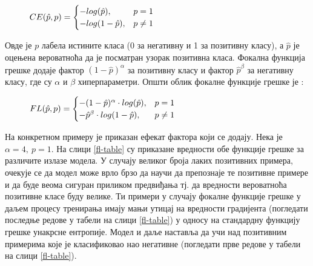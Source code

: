 \documentclass[11pt,oneside]{memoir}
\begin{document}
\begin{figure}[H]
  \centering
  $ CE(\hat{p}, p) =
  \begin{cases}
    \centering
    -log(\hat{p}), & p = 1 \\
    -log(1-\hat{p}), & p \neq 1
  \end{cases}
  $
\end{figure}

Овде је $p$ лабела истините класа (0 за негативну и 1 за позитивну класу), а $\hat{p}$ је оцењена вероватноћа да је посматран узорак позитивна класа.
Фокална функција грешке додаје фактор $(1 - \hat{p})^{\alpha}$ за позитивну класу и фактор $\hat{p}^{\beta}$
за негативну класу, где су $\alpha$ и $\beta$ хиперпараметри. Општи облик фокалне функције грешке је \cite{focal_loss}:

\begin{figure}[H]
  \centering
  $ FL(\hat{p}, p) =
  \begin{cases}
    \centering
    -(1 - \hat{p})^{\alpha}\cdot log(\hat{p}) , & p = 1 \\
    -\hat{p}^{\beta}\cdot log(1-\hat{p}), & p \neq 1
  \end{cases}
  $
\end{figure}

На конкретном примеру је приказан ефекат фактора који се додају. Нека је $\alpha = 4,\ p = 1$. На слици \ref{fl-table} су приказане
вредности обе функције грешке за различите излазе модела. У случају великог броја лаких позитивних примера, очекује се да модел 
може врло брзо да научи да препознаје те позитивне примере и да буде веома сигуран приликом предвиђања тј. да вредности 
вероватноћа позитивне класе буду велике. Ти примери у случају фокалне функције грешке у даљем процесу тренирања имају мањи утицај
на вредности градијента (погледати последње редове у табели на слици \ref{fl-table}) у односу на стандардну функцију грешке унакрсне ентропије. 
Модел и даље наставља да учи над позитивним примерима које је класификовао нао негативне (погледати прве редове у табели на слици \ref{fl-table}).
\end{document}

